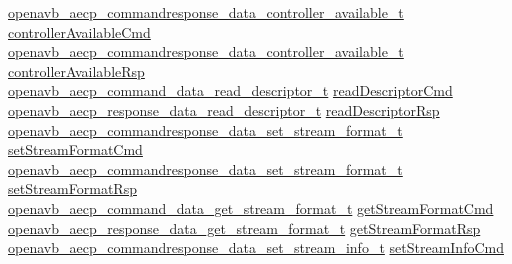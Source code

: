 \begin{DoxyCompactItemize}
\begin{tabbing}
\>\hyperlink{structopenavb__aecp__commandresponse__data__controller__available__t}{openavb\_aecp\_commandresponse\_data\_controller\_available\_t} \hyperlink{structopenavb__aecp__entity__model__data__unit__t_a9133da653585ba1f1e6f8a96785a37e2}{controllerAvailableCmd}\\
\>\hyperlink{structopenavb__aecp__commandresponse__data__controller__available__t}{openavb\_aecp\_commandresponse\_data\_controller\_available\_t} \hyperlink{structopenavb__aecp__entity__model__data__unit__t_a0563a7907048cb1f1e208a1da8c81560}{controllerAvailableRsp}\\
\>\hyperlink{structopenavb__aecp__command__data__read__descriptor__t}{openavb\_aecp\_command\_data\_read\_descriptor\_t} \hyperlink{structopenavb__aecp__entity__model__data__unit__t_a85da0a0c961a475372a50ea0ddcb8bce}{readDescriptorCmd}\\
\>\hyperlink{structopenavb__aecp__response__data__read__descriptor__t}{openavb\_aecp\_response\_data\_read\_descriptor\_t} \hyperlink{structopenavb__aecp__entity__model__data__unit__t_a463e5f6c364c8413f6a6b037d8944741}{readDescriptorRsp}\\
\>\hyperlink{structopenavb__aecp__commandresponse__data__set__stream__format__t}{openavb\_aecp\_commandresponse\_data\_set\_stream\_format\_t} \hyperlink{structopenavb__aecp__entity__model__data__unit__t_a546c17da78a7dd5a7de12d8b9152cc3e}{setStreamFormatCmd}\\
\>\hyperlink{structopenavb__aecp__commandresponse__data__set__stream__format__t}{openavb\_aecp\_commandresponse\_data\_set\_stream\_format\_t} \hyperlink{structopenavb__aecp__entity__model__data__unit__t_a6f79c4af374044be661f740a174535bc}{setStreamFormatRsp}\\
\>\hyperlink{structopenavb__aecp__command__data__get__stream__format__t}{openavb\_aecp\_command\_data\_get\_stream\_format\_t} \hyperlink{structopenavb__aecp__entity__model__data__unit__t_ae425075062fcb74ebd8ee7b04af5463d}{getStreamFormatCmd}\\
\>\hyperlink{structopenavb__aecp__response__data__get__stream__format__t}{openavb\_aecp\_response\_data\_get\_stream\_format\_t} \hyperlink{structopenavb__aecp__entity__model__data__unit__t_aec44c19ff969e64f903f4b18b60389c6}{getStreamFormatRsp}\\
\>\hyperlink{structopenavb__aecp__commandresponse__data__set__stream__info__t}{openavb\_aecp\_commandresponse\_data\_set\_stream\_info\_t} \hyperlink{structopenavb__aecp__entity__model__data__unit__t_a014d2445a78878a22d3c94679514404e}{setStreamInfoCmd}\\

\end{tabbing}
\end{DoxyCompactItemize}
